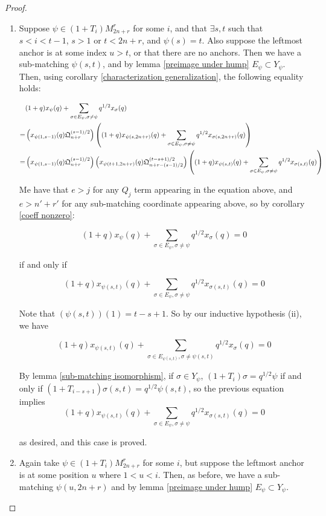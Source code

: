 \documentclass{amsart}
\begin{document}
\begin{proof}
 	\begin{enumerate}[label={case \arabic*:}]
 		\item Suppose $\psi\in (1+T_i)M_{2n+r}^r$ for some $i$, and that $\exists s,t$ such that $s<i<t-1$, $s>1$ or $t<2n+r$, and $\psi(s)=t$. Also suppose the leftmost anchor is at some index $u>t$, or that there are no anchors. Then we have a sub-matching $\psi(s,t)$, and by lemma \ref{preimage under hump} $E_\psi\subset Y_\psi$. Then, using corollary \ref{characterization generalization}, the following equality holds:
 		
 		\begin{align*}
 		&(1+q)x_\psi(q)+\sum_{\sigma\in E_\psi,\sigma\not=\psi}q^{1/2}x_\sigma(q)\\
 		=&\left( x_{\psi(1,s-1)}(q)\mathfrak{Q}_{n+r}^{(s-1)/2} \right)\left( (1+q)x_{\psi(s,2n+r)}(q)+\sum_{\sigma\in E_\psi,\sigma\not=\psi}q^{1/2}x_{\sigma(s,2n+r)}(q) \right)\\
 		=&\left( x_{\psi(1,s-1)}(q)\mathfrak{Q}_{n+r}^{(s-1)/2} \right)\left( x_{\psi(t+1,2n+r)}(q)\mathfrak{Q}_{n+r-(s-1)/2}^{(t-s+1)/2} \right)\left( (1+q)x_{\psi(s,t)}(q)+\sum_{\sigma\in E_\psi,\sigma\not=\psi}q^{1/2}x_{\sigma(s,t)}(q) \right)
 		\end{align*}
 		
 		Me have that $e>j$ for any $Q_j$ term appearing in the equation above, and $e>n'+r'$ for any sub-matching coordinate appearing above, so by corollary \ref{coeff nonzero}:
 		
 		$$(1+q)x_\psi(q)+\sum_{\sigma\in E_\psi,\sigma\not=\psi}q^{1/2}x_\sigma(q)=0$$
 		
 		if and only if
 		
 		$$(1+q)x_{\psi(s,t)}(q)+\sum_{\sigma\in E_\psi,\sigma\not=\psi}q^{1/2}x_{\sigma(s,t)}(q)=0$$
 		
 		Note that $(\psi(s,t))(1)=t-s+1$. So by our inductive hypothesis (ii), we have 
 		
 		$$(1+q)x_{\psi(s,t)}(q)+\sum_{\sigma\in E_{\psi(s,t)},\sigma\not=\psi(s,t)}q^{1/2}x_{\sigma}(q)=0$$
 		
 		By lemma \ref{sub-matching isomorphism}, if $\sigma\in Y_\psi$, $(1+T_i)\sigma=q^{1/2}\psi$ if and only if $(1+T_{i-s+1})\sigma(s,t)=q^{1/2}\psi(s,t)$, so the previous equation implies $$(1+q)x_{\psi(s,t)}(q)+\sum_{\sigma\in E_\psi,\sigma\not=\psi}q^{1/2}x_{\sigma(s,t)}(q)=0$$
 		
 		as desired, and this case is proved.
 		
 		\vspace{5mm}
 		\item Again take $\psi\in (1+T_i)M_{2n+r}^r$ for some $i$, but suppose the leftmost anchor is at some position $u$ where $1<u<i$. Then, as before, we have a sub-matching $\psi(u,2n+r)$ and by lemma \ref{preimage under hump} $E_\psi\subset Y_\psi$.
 		

\end{enumerate}
\end{proof}
\end{document}
